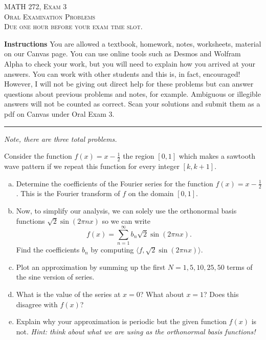 \documentclass[12pt]{amsbook}
\begin{document}

\begin{center}
   \textsc{\large MATH 272, Exam 3}\\
   \textsc{Oral Examination Problems}\\
   \textsc{Due one hour before your exam time slot.}
\end{center}

\vspace{1cm}

\noindent\textbf{Instructions} \; You are allowed a textbook, homework, notes, worksheets, material on our Canvas page.  You can use online tools such as Desmos and Wolfram Alpha to check your work, but you will need to explain how you arrived at your answers.  You can work with other students and this is, in fact, encouraged! However, I will not be giving out direct help for these problems but can answer questions about previous problems and notes, for example. Ambiguous or illegible answers will not be counted as correct. Scan your solutions and submit them as a pdf on Canvas under Oral Exam 3.


\vspace{1cm}


\hrule

\vspace*{1cm}
\noindent\emph{Note, there are three total problems.}

\newpage
\begin{problem}
Consider the function $f(x)=x-\frac{1}{2}$ the region $[0,1]$ which makes a sawtooth wave pattern if we repeat this function for every integer $[k,k+1]$.
\begin{enumerate}[(a)]
    \item Determine the coefficients of the Fourier series for the function $f(x)=x-\frac{1}{2}$. This is the Fourier transform of $f$ on the domain $[0,1]$.
    \item Now, to simplify our analysis, we can solely use the orthonormal basis functions $\sqrt{2}\sin(2\pi n x)$ so we can write
    \[
        f(x) = \sum_{n=1}^\infty b_n \sqrt{2}\sin(2\pi n x).
    \]
    Find the coefficients $b_n$ by computing $\langle f, \sqrt{2}\sin(2\pi n x)\rangle$.
    \item Plot an approximation by summing up the first $N=1,5,10,25,50$ terms of the sine version of series. 
    \item What is the value of the series at $x=0$? What about $x=1$? Does this disagree with $f(x)$?
    \item Explain why your approximation is periodic but the given function $f(x)$ is not. \emph{Hint: think about what we are using as the orthonormal basis functions!}
\end{enumerate}
\end{problem}
\end{document}
